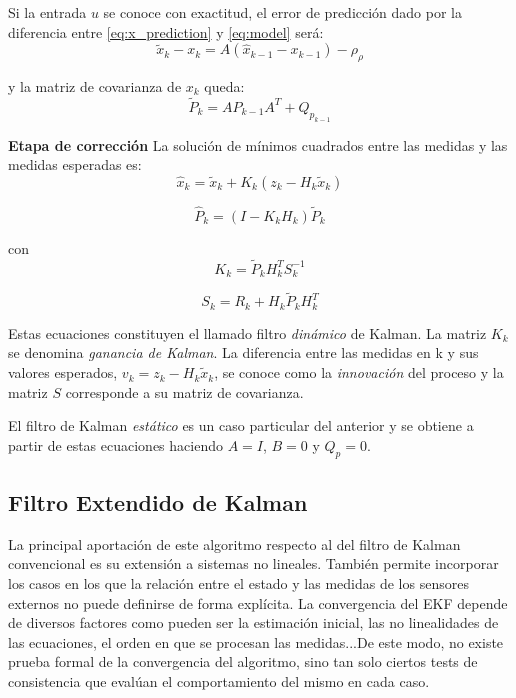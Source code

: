Si la entrada $u$ se conoce con exactitud, el error de predicción dado por la diferencia entre \ref{eq:x_prediction} y \ref{eq:model} será:
\begin{equation}\label{eq:prediction_error}
    \tilde{x}_{k}-x_{k} = A(\hat{x}_{k-1}-x_{k-1})- \rho_{\rho}
\end{equation}

y la matriz de covarianza de $x_{k}$ queda:
\begin{equation}\label{eq:P_prediction}
    \tilde{P}_{k} = A\hat{P}_{k-1}A^{T}+Q_{p_{k-1}}
\end{equation}


\textbf{Etapa de corrección}
La solución de mínimos cuadrados entre las medidas y las medidas esperadas es:
\begin{equation}\label{eq:x_estimation}
    \hat{x}_{k} = \tilde{x}_{k}+K_{k}(z_{k}-H_{k}\tilde{x}_{k})
\end{equation}

\begin{equation}\label{eq:P_estimation}
    \hat{P}_{k} = (I-K_{k}H_{k})\tilde{P}_{k}
\end{equation}

con
\begin{equation}\label{eq:K}
    K_{k} = \tilde{P}_{k}H_{k}^{T}S_{k}^{-1}
\end{equation}

\begin{equation}\label{eq:S}
    S_{k} = R_{k}+H_{k}\tilde{P}_{k}H_{k}^{T}
\end{equation}

Estas ecuaciones constituyen el llamado filtro \emph{dinámico} de Kalman.
La matriz $K_{k}$ se denomina \emph{ganancia de Kalman}.
La diferencia entre las medidas en k y sus valores esperados, $v_{k} = z_{k}-H_{k}\tilde{x}_{k}$, se conoce como la \emph{innovación} del proceso y la matriz $S$ corresponde a su matriz de covarianza.

El filtro de Kalman \emph{estático} es un caso particular del anterior y se obtiene a partir de estas ecuaciones haciendo $A = I$, $B = 0$ y $Q_{p} = 0$.

\subsection{Filtro Extendido de Kalman}
La principal aportación de este algoritmo respecto al del filtro de Kalman convencional es su extensión a sistemas no lineales. También permite incorporar los casos en los que la relación entre el estado y las medidas de los sensores externos no puede definirse de forma explícita. La convergencia del EKF depende de diversos factores como pueden ser la estimación inicial, las no linealidades de las ecuaciones, el orden en que se procesan las medidas...De este modo, no existe prueba formal de la convergencia del algoritmo, sino tan solo ciertos tests de consistencia que evalúan el comportamiento del mismo en cada caso.

